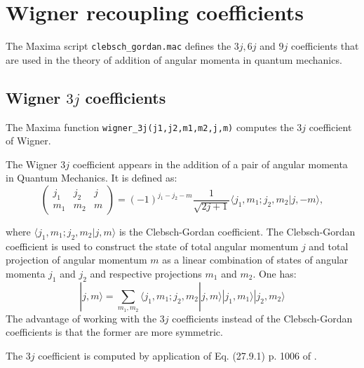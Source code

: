 \documentclass[11pt]{article}
\begin{document}
\section{Wigner recoupling coefficients}

The Maxima script \texttt{clebsch\_gordan.mac} defines the $3j,6j$ and $9j$ 
 coefficients that are used in the theory of addition of angular momenta 
in quantum mechanics\cite{landau_mecaq,messiah_field_chapter}. 


\subsection{Wigner $3j$ coefficients}

The Maxima function \texttt{wigner\_3j(j1,j2,m1,m2,j,m)} computes the $3j$ 
coefficient of Wigner.

The Wigner $3j$ coefficient appears in the addition of a pair of angular 
momenta in Quantum Mechanics. 
It is defined as\cite{landau_mecaq,messiah_field_chapter}:
\begin{equation}
  \label{eq:3j-def}
  \left(\begin{array}{ccc} j_1 & j_2 & j \\ m_1 & m_2 & m\end{array} \right) = (-1)^{j_1-j_2-m} \frac 1 {\sqrt{2j+1}} \langle j_1,m_1; j_2, m_2 | j,-m\rangle,   
\end{equation} 

where $ \langle j_1,m_1; j_2, m_2 | j,m\rangle$ is the 
Clebsch-Gordan coefficient. The Clebsch-Gordan coefficient is used to 
construct the state of total angular momentum $j$ and total projection 
of angular momentum $m$ as a linear combination of states of angular momenta 
$j_1$ and $j_2$ and respective projections $m_1$ and $m_2$.
One has:
\begin{equation}
  |j,m\rangle = \sum_{m_1,m_2} \langle j_1,m_1;j_2,m_2|j,m\rangle |j_1,m_1\rangle  |j_2,m_2\rangle  
\end{equation}
The advantage of working with the $3j$ coefficients instead of the 
Clebsch-Gordan coefficients is that the former are more symmetric\cite{landau_mecaq}. 
 

The $3j$ coefficient is computed by application of  
Eq. (27.9.1) p. 1006 of \cite{abramowitz_math_functions}.  
\end{document}
